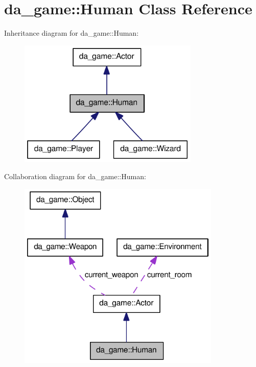 \hypertarget{classda__game_1_1Human}{
\section{da\_\-game::Human Class Reference}
\label{classda__game_1_1Human}
}
Inheritance diagram for da\_\-game::Human:\nopagebreak
\begin{figure}[H]
\begin{center}
\leavevmode
\includegraphics[width=244pt]{classda__game_1_1Human__inherit__graph}
\end{center}
\end{figure}
Collaboration diagram for da\_\-game::Human:\nopagebreak
\begin{figure}[H]
\begin{center}
\leavevmode
\includegraphics[width=274pt]{classda__game_1_1Human__coll__graph}
\end{center}
\end{figure}
